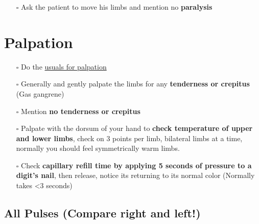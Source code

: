 \documentclass[
  13.5pt,
  a4paper,
  DIV=11,
  numbers=noendperiod]{scrreprt}
\providecommand{\tightlist}{%
  \setlength{\itemsep}{0pt}\setlength{\parskip}{0pt}}
\begin{document}
\begin{itemize}
\tightlist
\item[$\square$]
  Ask the patient to move his limbs and mention no \textbf{paralysis}
\end{itemize}

\section{Palpation}\label{palpation-4}

\begin{itemize}
\tightlist
\item[$\square$]
  Do the \href{miscellaneous.qmd}{usuals for palpation}\\
\item[$\square$]
  Generally and gently palpate the limbs for any \textbf{tenderness or
  crepitus} (Gas gangrene)\\
\item[$\square$]
  Mention \textbf{no tenderness or crepitus}\\
\item[$\square$]
  Palpate with the dorsum of your hand to \textbf{check temperature of
  upper and lower limbs}, check on 3 points per limb, bilateral limbs at
  a time, normally you should feel symmetrically warm limbs.\\
\item[$\square$]
  Check \textbf{capillary refill time by applying 5 seconds of pressure
  to a digit's nail}, then release, notice its returning to its normal
  color (Normally takes \textless3 seconds)
\end{itemize}

\subsection{All Pulses (Compare right and
left!)}\label{all-pulses-compare-right-and-left}
\end{document}
